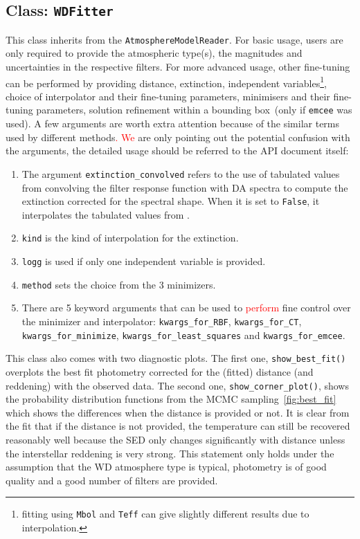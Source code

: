 \documentclass[fleqn,usenatbib]{rasti}
\begin{document}
\subsection{Class: \texttt{WDFitter}}
\label{sec:wdfitter}
This class inherits from the \verb+AtmosphereModelReader+. For basic usage,
users are only required to provide the atmospheric type(s), the magnitudes and
uncertainties in the respective filters. For more advanced usage, other
fine-tuning can be performed by providing distance, extinction, independent
variables\footnote{fitting using \texttt{Mbol} and \texttt{Teff} can give slightly
different results due to interpolation.}, choice of interpolator and their
fine-tuning parameters, minimisers and their fine-tuning parameters,
solution refinement within a bounding box~(only if \verb+emcee+ was used).
A few arguments are worth extra attention because of the similar terms used
by different methods\textcolor{red}{. We} are only pointing out the potential confusion with
the arguments, the detailed usage should be referred to the API document
itself:
\begin{enumerate}
    \item The argument \verb+extinction_convolved+ refers to the use of
    tabulated values from convolving the filter response function with DA
    spectra to compute the extinction corrected for the spectral shape.
    When it is set to \verb+False+, it interpolates the tabulated values
    from \citet{2011ApJ...737..103S}.
    \item \verb+kind+ is the kind of interpolation for the extinction.
    \item \verb+logg+ is used if only one independent variable is
    provided.
    \item \verb+method+ sets the choice from the 3 minimizers.
    \item There are 5 keyword arguments that can be used to
    \textcolor{red}{perform} fine control over the minimizer and
    interpolator: \verb+kwargs_for_RBF+, \verb+kwargs_for_CT+,
    \verb+kwargs_for_minimize+, \verb+kwargs_for_least_squares+ and
    \verb+kwargs_for_emcee+.
\end{enumerate}

This class also comes with two diagnostic plots. The first one,
\verb+show_best_fit()+ overplots the best fit photometry corrected for the
(fitted) distance (and reddening) with the observed
data. The second one, \verb+show_corner_plot()+,
shows the probability distribution functions from the MCMC
sampling~\ref{fig:best_fit} which shows the differences when the distance
is provided or not. It is clear from the fit that if the distance is not
provided, the temperature can still be recovered reasonably well because
the SED only changes significantly with distance unless the interstellar
reddening is very strong. This statement only holds under the assumption
that the WD atmosphere type is typical, photometry is of good quality and
a good number of filters are provided.
\end{document}

